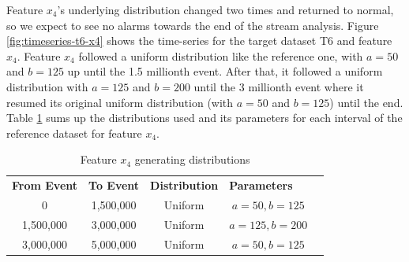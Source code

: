 Feature $x_4$'s underlying distribution changed two times and returned to normal, so we expect to see no alarms towards the end of the stream analysis. Figure \ref{fig:timeseries-t6-x4} shows the time-series for the target dataset T6 and feature $x_4$. Feature $x_4$ followed a uniform distribution like the reference one, with $a=50$ and $b=125$ up until the 1.5 millionth event. After that, it followed a uniform distribution with $a=125$ and $b=200$ until the 3 millionth event where it resumed its original uniform distribution (with $a=50$ and $b=125$) until the end. Table \ref{tbl:multi-feat-x4-changes} sums up the distributions used and its parameters for each interval of the reference dataset for feature $x_4$.
\begin{table}[!htb]
    \begin{center}
    \begin{tabular}{|c|c|c|c|l}
    \cline{1-4}
    \textbf{From Event} & \textbf{To Event} & \textbf{Distribution} & \multicolumn{1}{l|}{\textbf{Parameters}} &  \\ \cline{1-4}
    0                   & 1,500,000         & Uniform               & $a=50, b=125$                            &  \\ \cline{1-4}
    1,500,000           & 3,000,000         & Uniform               & $a=125, b=200$                           &  \\ \cline{1-4}
    3,000,000           & 5,000,000         & Uniform               & $a=50, b=125$                            &  \\ \cline{1-4}
    \end{tabular}
    \end{center}
    \caption{Feature $x_4$ generating distributions}
    \label{tbl:multi-feat-x4-changes}
\end{table}


